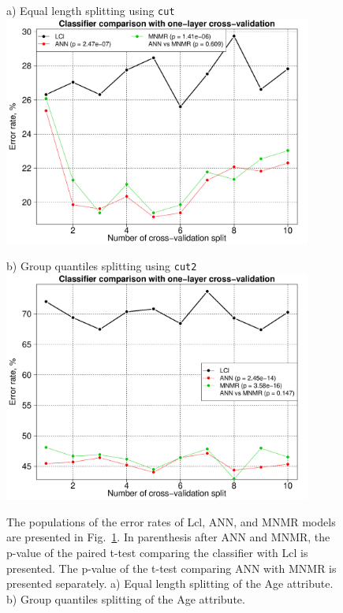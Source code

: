 \documentclass[10pt, paper=a4]{article}
\begin{document}
\begin{figure}[h!]
  \begin{minipage}{0.49\textwidth}
    a) Equal length splitting using \verb|cut|\\
    \includegraphics[width = 0.9\textwidth]{classifier_comparison_cut_1.pdf}
  \end{minipage} \hfill
  \begin{minipage}{0.49\textwidth}
    b) Group quantiles splitting using \verb|cut2|\\
    \includegraphics[width = 0.9\textwidth]{classifier_comparison_cut_2.pdf}
  \end{minipage} \vfill
  \caption{The populations of the error rates of Lcl, ANN, and MNMR
    models are presented in Fig.~\ref{fig:comparison}.  In parenthesis
    after ANN and MNMR, the p-value of the paired t-test comparing the
    classifier with Lcl is presented.  The p-value of the t-test
    comparing ANN with MNMR is presented separately. a) Equal length
    splitting of the Age attribute.  b) Group quantiles splitting of
    the Age attribute.}
  \label{fig:comparison}
\end{figure}
\end{document}
